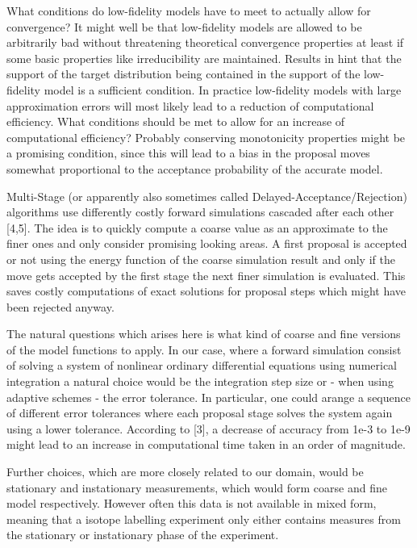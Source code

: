 \documentclass[10pt]{article}
\newcommand{\todo}[1]{{\color{red}#1}}
\begin{document}
What conditions do low-fidelity models have to meet to actually allow for convergence?
It might well be that low-fidelity models are allowed to be arbitrarily bad without threatening
theoretical convergence properties at least if some basic properties like irreducibility are maintained.
Results in \cite{efendiev06} hint that the support of the target distribution being contained 
in the support of the low-fidelity model is a sufficient condition.
In practice low-fidelity models with large approximation errors will most likely lead to a
reduction of computational efficiency. 
What conditions should be met to allow for an increase of computational efficiency?
Probably conserving monotonicity properties might be a promising condition, since this will lead
to a bias in the proposal moves somewhat proportional to the acceptance probability of the accurate
model.

\bigskip
\noindent \todo{from here on still very much a draft}
\bigskip

Multi-Stage (or apparently also sometimes called Delayed-Acceptance/Rejection) algorithms 
use differently costly forward simulations cascaded after each other [4,5].
The idea is to quickly compute a coarse value as an approximate to the finer ones and only
consider promising looking areas.
A first proposal is accepted or not using the energy function of the coarse simulation result and 
only if the move gets accepted by the first stage the next finer simulation is evaluated.
This saves costly computations of exact solutions for proposal steps which might have been rejected
anyway.

The natural questions which arises here is what kind of coarse and fine versions of the model 
functions to apply.
In our case, where a forward simulation consist of solving a system of nonlinear ordinary differential 
equations using numerical integration a natural choice would be the integration step size or - when using
adaptive schemes - the error tolerance.
In particular, one could arange a sequence of different error tolerances where each proposal stage
solves the system again using a lower tolerance.
According to [3], a decrease of accuracy from 1e-3 to 1e-9 might lead to an increase in computational
time taken in an order of magnitude.

Further choices, which are more closely related to our domain, would be stationary and instationary 
measurements, which would form coarse and fine model respectively.
However often this data is not available in mixed form, meaning that a isotope labelling experiment
only either contains measures from the stationary or instationary phase of the experiment.
\end{document}
